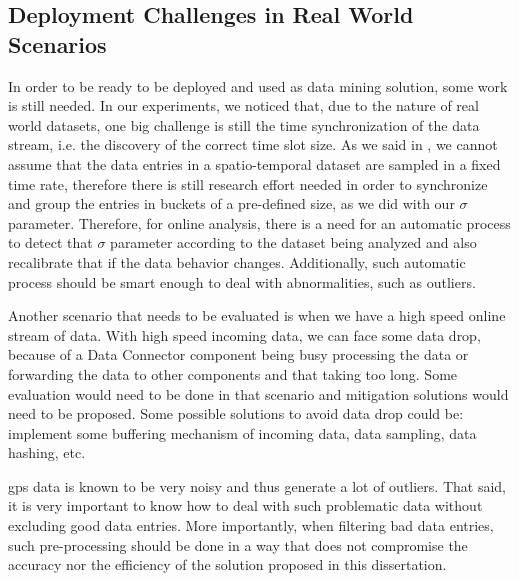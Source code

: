 \subsection{Deployment Challenges in Real World Scenarios}
In order to be ready to be deployed and used as data mining solution, some work is still needed. In our experiments, we
noticed that, due to the nature of real world datasets, one big challenge is still the time synchronization of the data
stream, i.e. the discovery of the correct time slot size. As we said in , we cannot assume
that the data entries in a spatio-temporal dataset are sampled in a fixed time rate, therefore there is still research
effort needed in order to synchronize and group the entries in buckets of a pre-defined size, as we did with our
$\sigma$ parameter. Therefore, for online analysis, there is a need for an automatic process to detect that $\sigma$
parameter according to the dataset being analyzed and also recalibrate that if the data behavior changes. Additionally,
such automatic process should be smart enough to deal with abnormalities, such as outliers.

Another scenario that needs to be evaluated is when we have a high speed online stream of data. With high speed incoming
data, we can face some data drop, because of a Data Connector component being busy processing the data or forwarding the
data to other components and that taking too long. Some evaluation would need to be done in that scenario and mitigation
solutions would need to be proposed. Some possible solutions to avoid data drop could be: implement some buffering
mechanism of incoming data, data sampling, data hashing, etc.

\ac{gps} data is known to be very noisy and thus generate a lot of outliers. That said, it is very important to know how
to deal with such problematic data without excluding good data entries. More importantly, when filtering bad data
entries, such pre-processing should be done in a way that does not compromise the accuracy nor the efficiency of the
solution proposed in this dissertation.
